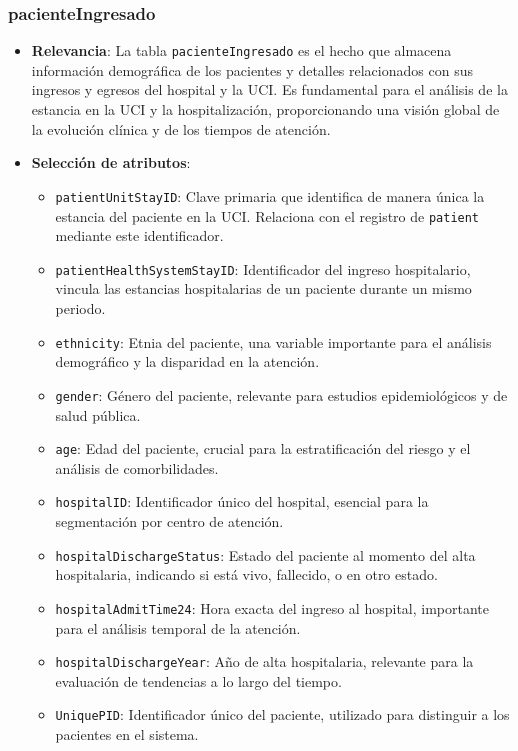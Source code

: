 \documentclass[12pt, a4paper, twoside]{article}
\begin{document}
	\subsubsection{pacienteIngresado}
	
	
	
	\begin{itemize}
		\item \textbf{Relevancia}: La tabla \texttt{pacienteIngresado} es el hecho que almacena información demográfica de los pacientes y detalles relacionados con sus ingresos y egresos del hospital y la UCI. Es fundamental para el análisis de la estancia en la UCI y la hospitalización, proporcionando una visión global de la evolución clínica y de los tiempos de atención.
		
		\item \textbf{Selección de atributos}:
		\begin{itemize}
			\item \texttt{patientUnitStayID}: Clave primaria que identifica de manera única la estancia del paciente en la UCI. Relaciona con el registro de \texttt{patient} mediante este identificador.
			\item \texttt{patientHealthSystemStayID}: Identificador del ingreso hospitalario, vincula las estancias hospitalarias de un paciente durante un mismo periodo.
			\item \texttt{ethnicity}: Etnia del paciente, una variable importante para el análisis demográfico y la disparidad en la atención.
			\item \texttt{gender}: Género del paciente, relevante para estudios epidemiológicos y de salud pública.
			\item \texttt{age}: Edad del paciente, crucial para la estratificación del riesgo y el análisis de comorbilidades.
			\item \texttt{hospitalID}: Identificador único del hospital, esencial para la segmentación por centro de atención.
			\item \texttt{hospitalDischargeStatus}: Estado del paciente al momento del alta hospitalaria, indicando si está vivo, fallecido, o en otro estado.
			\item \texttt{hospitalAdmitTime24}: Hora exacta del ingreso al hospital, importante para el análisis temporal de la atención.
			\item \texttt{hospitalDischargeYear}: Año de alta hospitalaria, relevante para la evaluación de tendencias a lo largo del tiempo.
			\item \texttt{UniquePID}: Identificador único del paciente, utilizado para distinguir a los pacientes en el sistema.
		\end{itemize}
		
	\end{itemize}
	
\end{document}
